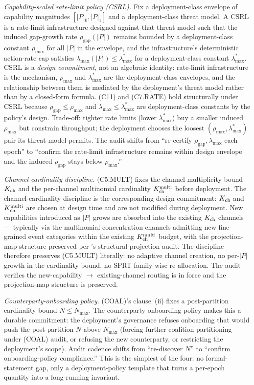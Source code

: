 \emph{Capability-scaled rate-limit policy (CSRL).}  Fix a
deployment-class envelope of capability magnitudes
$[|P|_0, |P|_1]$ and a deployment-class threat model. A CSRL is
a rate-limit infrastructure designed against that threat model
such that the induced gap-growth rate
$\rho_{\mathrm{gap}}(|P|)$ remains bounded by a deployment-class
constant $\rho_{\max}$ for all $|P|$ in the envelope, and the
infrastructure's deterministic action-rate cap satisfies
$\lambda_{\max}(|P|) \leq \lambda_{\max}^*$ for a deployment-class
constant $\lambda_{\max}^*$. CSRL is a \emph{design commitment},
not an algebraic identity: rate-limit infrastructure is the
mechanism, $\rho_{\max}$ and $\lambda_{\max}^*$ are the
deployment-class envelopes, and the relationship between them is
mediated by the deployment's threat model rather than by a
closed-form formula. (C11) and (C7.RATE) hold structurally under
CSRL because $\rho_{\mathrm{gap}} \leq \rho_{\max}$ and
$\lambda_{\max} \leq \lambda_{\max}^*$ are deployment-class
constants by the policy's design. Trade-off: tighter rate limits
(lower $\lambda_{\max}^*$) buy a smaller induced $\rho_{\max}$ but
constrain throughput; the deployment chooses the loosest
$(\rho_{\max}, \lambda_{\max}^*)$ pair its threat model permits.
The audit shifts from ``re-certify
$\rho_{\mathrm{gap}}, \lambda_{\max}$ each epoch'' to ``confirm the
rate-limit infrastructure remains within design envelope and the
induced $\rho_{\mathrm{gap}}$ stays below $\rho_{\max}$.''

\emph{Channel-cardinality discipline.}  (C5.MULT) fixes the
channel-multiplicity bound $K_{\mathrm{ch}}$ and the per-channel multinomial
cardinality $K_{\mathrm{ch}}^{\mathrm{multi}}$ before deployment. The channel-cardinality
discipline is the corresponding design commitment: $K_{\mathrm{ch}}$ and
$K_{\mathrm{ch}}^{\mathrm{multi}}$ are chosen at design time and are not modified during
deployment. New capabilities introduced as $|P|$ grows are
absorbed into the existing $K_{\mathrm{ch}}$ channels --- typically via the
multinomial concentration channels admitting new fine-grained
event categories within the existing $K_{\mathrm{ch}}^{\mathrm{multi}}$ budget, with the
projection-map structure preserved per
\citep[\S 6]{lasser2026foundations}'s structural-projection audit.
The discipline therefore preserves (C5.MULT) literally: no
adaptive channel creation, no per-$|P|$ growth in the cardinality
bound, no SPRT family-wise re-allocation. The audit verifies the
new-capability $\to$ existing-channel routing is in force and the
projection-map structure is preserved.

\emph{Counterparty-onboarding policy.}  (COAL)'s clause~(ii)
fixes a post-partition cardinality bound $N \leq N_{\max}$. The
counterparty-onboarding policy makes this a durable commitment:
the deployment's governance refuses onboarding that would push
the post-partition $N$ above $N_{\max}$ (forcing further
coalition partitioning under (COAL) audit, or refusing the new
counterparty, or restricting the deployment's scope). Audit
cadence shifts from ``re-discover $N$'' to ``confirm
onboarding-policy compliance.'' This is the simplest of the
four: no formal-statement gap, only a deployment-policy template
that turns a per-epoch quantity into a long-running invariant.

